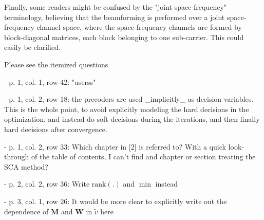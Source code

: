 \begin{itemize}
 {Finally, some readers might be confused by the "joint space-frequency" terminology, believing that the beamforming is performed over a joint space-frequency channel space, where the space-frequency channels are formed by block-diagonal matrices, each block belonging to one sub-carrier. This could easily be clarified.} 

\resp {}

 {Please see the itemized questions}

\begin{itemize}

 - {p. 1, col. 1, row 42: "userss"}

\resp {}

 - {p. 1, col. 2, row 18: the precoders are used \_implicitly\_ as decision variables. This is the whole point, to avoid explicitly modeling the hard decisions in the optimization, and instead do soft decisions during the iterations, and then finally hard decisions after convergence.}

\resp {}

 - {p. 1, col. 2, row 33: Which chapter in [2] is referred to? With a quick look-through of the table of contents, I can't find and chapter or section treating the SCA method?}

\resp {}

 - {p. 2, col. 2, row 36: Write $\text{rank}(.)$ and $\min$ instead}

\resp {}

 - {p. 3, col. 1, row 26: It would be more clear to explicitly write out the dependence of $\mathbf{M}$ and $\mathbf{W}$ in $\tilde{v}$ here}

\resp {}


\end{itemize}
\end{itemize}
